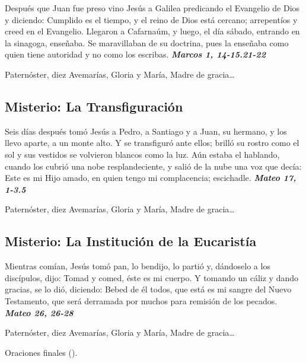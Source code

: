 \documentclass[./rosary.tex]{subfiles}
\newcounter{lux-counter}
\begin{document}
Después que Juan fue preso vino Jesús a Galilea predicando el Evangelio de Dios y diciendo: Cumplido es el tiempo, 
y el reino de Dios está cercano; arrepentíos y creed en el Evangelio. Llegaron a Cafarnaúm, y luego, el día sábado, 
entrando en la sinagoga, enseñaba. Se maravillaban de su doctrina, pues la enseñaba como quien tiene autoridad y 
no como los escribas. 
\textbf{\emph{Marcos 1, 14-15.21-22}}

\begin{center}
      Paternóster, diez Avemarías, Gloria y María, Madre de gracia{\ldots}
\end{center}

\bigskip

\subsection*{ Misterio: La Transfiguración}

Seis días después tomó Jesús a Pedro, a Santiago y a Juan, su hermano, y los llevo aparte, a un monte alto. 
Y se transfiguró ante ellos; brilló su rostro como el sol y sus vestidos se volvieron blancos como la luz. Aún estaba el hablando, 
cuando los cubrió una nobe resplandeciente, y salió de la nube una voz que decía: Este es mi Hijo amado, 
en quien tengo mi complacencia; escichadle. \textbf{\emph{Mateo 17, 1-3.5}}

\begin{center}
      Paternóster, diez Avemarías, Gloria y María, Madre de gracia{\ldots}
\end{center}

\bigskip

\subsection*{ Misterio: La Institución de la Eucaristía}

Mientras comían, Jesús tomó pan, lo bendijo, lo partió y, dándoselo a los discípulos, dijo: Tomad y comed, éste es mi cuerpo. 
Y tomando un cáliz y dando gracias, se lo dió, diciendo: Bebed de él todos, que está es mi sangre del Nuevo Testamento, 
que será derramada por muchos para remisión de los pecados. \textbf{\emph{Mateo 26, 26-28}}

\begin{center}
      Paternóster, diez Avemarías, Gloria y María, Madre de gracia{\ldots}
      
      Oraciones finales ().
\end{center}
\end{document}
